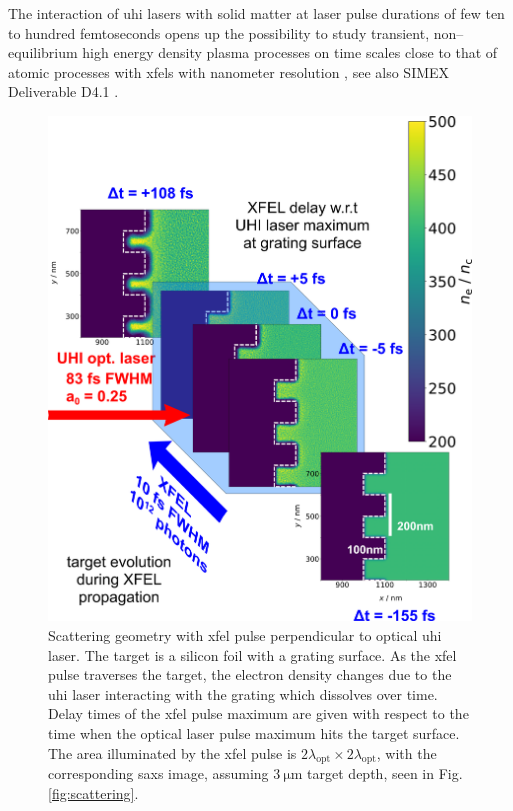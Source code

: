 The interaction of \gls{uhi} lasers with solid matter at laser
pulse durations of few ten to hundred femtoseconds opens up the possibility to
study transient, non--equilibrium high energy density plasma processes on time
scales close to that of atomic processes with \glspl{xfel} with
nanometer resolution \cite{Kluge2016}, see also SIMEX Deliverable D4.1
\cite{EUCALL_SIMEX_D4.1}.
%
\begin{figure}[ht]
  \centering
  \includegraphics[width=.95\linewidth]{figures/scattering_geometry_v4.png}
  \caption{
    Scattering geometry with \gls{xfel} pulse perpendicular to optical
    \gls{uhi} laser. The
    target is a silicon foil with a grating surface. As the \gls{xfel} pulse traverses the
    target, the electron density changes due to the \gls{uhi} laser interacting with the
    grating which dissolves over time. Delay times of the \gls{xfel} pulse maximum are
    given with respect to the time when the optical laser pulse maximum hits the
    target surface.  The area illuminated by the \gls{xfel} pulse is
    $2\lambda_\mathrm{opt} \times 2\lambda_\mathrm{opt}$, with the corresponding
    \gls{saxs} image, assuming $\SI{3}{\micro\metre}$ target depth, seen in Fig.
    \ref{fig:scattering}.  }
    \label{fig:density}
  \end{figure}
